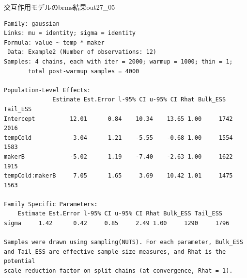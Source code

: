 \begin{Rscreen}{交互作用モデルのbrms結果}{out27_05}
   \begin{verbatim}
Family: gaussian 
Links: mu = identity; sigma = identity 
Formula: value ~ temp * maker 
 Data: Example2 (Number of observations: 12) 
Samples: 4 chains, each with iter = 2000; warmup = 1000; thin = 1;
       total post-warmup samples = 4000

Population-Level Effects: 
              Estimate Est.Error l-95% CI u-95% CI Rhat Bulk_ESS Tail_ESS
Intercept          12.01      0.84    10.34    13.65 1.00     1742     2016
tempCold           -3.04      1.21    -5.55    -0.68 1.00     1554     1583
makerB             -5.02      1.19    -7.40    -2.63 1.00     1622     1915
tempCold:makerB     7.05      1.65     3.69    10.42 1.01     1475     1563

Family Specific Parameters: 
    Estimate Est.Error l-95% CI u-95% CI Rhat Bulk_ESS Tail_ESS
sigma     1.42      0.42     0.85     2.49 1.00     1290     1796

Samples were drawn using sampling(NUTS). For each parameter, Bulk_ESS
and Tail_ESS are effective sample size measures, and Rhat is the potential
scale reduction factor on split chains (at convergence, Rhat = 1).
\end{verbatim}
\end{Rscreen}
